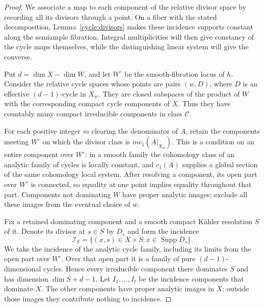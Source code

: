 \begin{proof}
We associate a map to each component of the relative divisor space by
recording all its divisors through a point.  On a fiber with the stated
decomposition, Lemma~\ref{cycle:divisors} makes these incidence supports
constant along the semiample fibration.  Integral multiplicities will
then give constancy of the cycle maps themselves, while the
distinguishing linear system will give the converse.

Put $d=\dim X-\dim W$, and let $W^\circ$ be the smooth-fibration locus
of $h$.  Consider the relative cycle spaces whose points are pairs
$(w,D)$, where $D$ is an effective $(d-1)$-cycle in $X_w$.  They are
closed subspaces of the product of $W$ with the corresponding compact
cycle components of $X$.  Thus they have countably many compact
irreducible components in class $\mathcal C$.

For each positive integer $m$ clearing the denominator of $A$, retain
the components meeting $W^\circ$ on which the divisor class is
$m c_1(A|_{X_w})$.  This is a condition on an entire component over
$W^\circ$: in a smooth family the cohomology class of an analytic
family of cycles is locally constant, and $c_1(A)$ supplies a global
section of the same cohomology local system.  After resolving a
component, its open part over $W^\circ$ is connected, so equality at
one point implies equality throughout that part.  Components not
dominating $W$ have proper analytic images; exclude all these images
from the eventual choice of $w$.

Fix a retained dominating component and a smooth compact K\"ahler
resolution $S$ of it.  Denote its divisor at $s\in S$ by $D_s$ and form
the incidence
\[
                    \mathcal I_S
                       =\{(x,s)\in X\times S:x\in\operatorname{Supp}D_s\}.
\]
We take the incidence of the analytic cycle family, including its
limits from the open part over $W^\circ$.  Over that open part it is a
family of pure $(d-1)$-dimensional cycles.  Hence every irreducible
component there dominates $S$ and has dimension $\dim S+d-1$.
Let $I_1,\ldots,I_t$ be the incidence components that dominate $X$.
The other components have proper analytic images in $X$; outside
those images they contribute nothing to incidence.


\end{proof}

